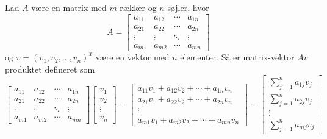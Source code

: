\begin{definition} \label{def:matrix_vector_pro}
    Lad $A$ være en matrix med $m$ rækker og $n$ søjler, hvor
    \[
    A = \begin{bmatrix}
    a_{11} & a_{12} & \cdots & a_{1n} \\
    a_{21} & a_{22} & \cdots & a_{2n} \\
    \vdots & \vdots & \ddots & \vdots \\
    a_{m1} & a_{m2} & \cdots & a_{mn}
    \end{bmatrix}
    \]
    og $v = (v_1, v_2, \ldots, v_n)^T$ være en vektor med $n$ elementer. Så er matrix-vektor $Av$ produktet defineret som
    \[
\begin{bmatrix}
    a_{11} & a_{12} & \cdots & a_{1n} \\
    a_{21} & a_{22} & \cdots & a_{2n} \\
    \vdots & \vdots & \ddots & \vdots \\
    a_{m1} & a_{m2} & \cdots & a_{mn}
\end{bmatrix}
\begin{bmatrix}
    v_{1} \\
    v_{2} \\
    \vdots \\
    v_{n}
\end{bmatrix}
=
\begin{bmatrix}
    a_{11}v_{1} + a_{12}v_{2} + \cdots + a_{1n}v_{n} \\
    a_{21}v_{1} + a_{22}v_{2} + \cdots + a_{2n}v_{n} \\
    \vdots \\
    a_{m1}v_{1} + a_{m2}v_{2} + \cdots + a_{mn}v_{n}
\end{bmatrix}
= \begin{bmatrix}
    \sum_{j=1}^{n} a_{1j}v_{j} \\
    \sum_{j=1}^{n} a_{2j}v_{j} \\
    \vdots \\
    \sum_{j=1}^{n} a_{mj}v_{j}
\end{bmatrix}
\]
\end{definition}

